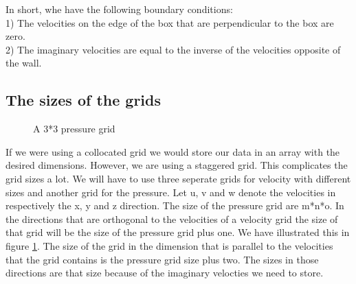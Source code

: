 \documentclass{article}
\begin{document}
In short, whe have the following boundary conditions: \\
1) The velocities on the edge of the box that are perpendicular to the box are zero.\\
2) The imaginary velocities are equal to the inverse of the velocities opposite of the wall.

\newpage
\subsection{The sizes of the grids}
\begin{figure}[ht]
\centering
\caption{A 3*3 pressure grid}
\label{grid sizes}
\end{figure}

If we were using a collocated grid we would store our data in an array with the desired dimensions. However, we are using a staggered grid. This complicates the grid sizes a lot. We will have to use three seperate grids for velocity with different sizes and another grid for the pressure. Let u, v and w denote the velocities in respectively the x, y and z direction. The size of the pressure grid are m*n*o. In the directions that are orthogonal to the velocities of a velocity grid the size of that grid will be the size of the pressure grid plus one. We have illustrated this in figure \ref{grid sizes}. The size of the grid in the dimension that is parallel to the velocities that the grid contains is the pressure grid size plus two. The sizes in those directions are that size because of the imaginary velocties we need to store.



\newpage
\end{document}
